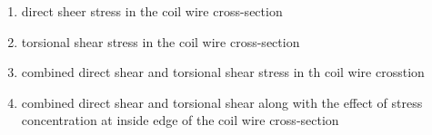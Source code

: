 \documentclass[journal]{IEEEtran}
\numberwithin{equation}{enumi}
\numberwithin{figure}{enumi}
\begin{document}
\begin{enumerate}
		\begin{figure}[H]
                \centering    
                \resizebox{0.3\textwidth}{!}{}    
                \end{figure} 

		\hfill{}

		\begin{enumerate}
			\item direct sheer stress in the coil wire cross-section 
			\item torsional shear stress in the coil wire cross-section
			\item combined direct shear and torsional shear stress in th coil wire crosstion
			\item combined direct shear and torsional shear along with the effect of stress concentration at inside edge of the coil wire cross-section
		\end{enumerate}
\end{enumerate}
\end{document}
